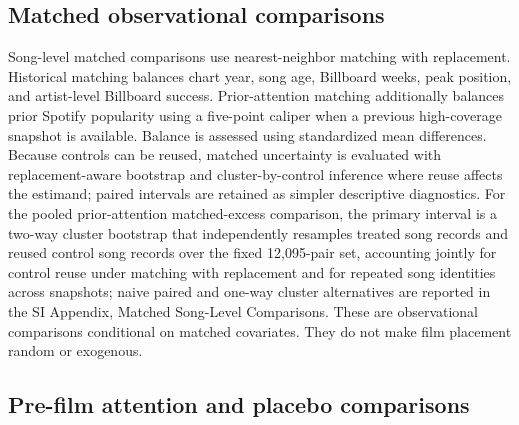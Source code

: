 \documentclass[10pt]{article}
\begin{document}
\subsection*{Matched observational comparisons}

Song-level matched comparisons use nearest-neighbor matching with replacement. Historical matching balances chart year, song age, Billboard weeks, peak position, and artist-level Billboard success. Prior-attention matching additionally balances prior Spotify popularity using a five-point caliper when a previous high-coverage snapshot is available. Balance is assessed using standardized mean differences. Because controls can be reused, matched uncertainty is evaluated with replacement-aware bootstrap and cluster-by-control inference where reuse affects the estimand; paired intervals are retained as simpler descriptive diagnostics. For the pooled prior-attention matched-excess comparison, the primary interval is a two-way cluster bootstrap that independently resamples treated song records and reused control song records over the fixed 12,095-pair set, accounting jointly for control reuse under matching with replacement and for repeated song identities across snapshots; naive paired and one-way cluster alternatives are reported in the SI Appendix, Matched Song-Level Comparisons. These are observational comparisons conditional on matched covariates. They do not make film placement random or exogenous.

\subsection*{Pre-film attention and placebo comparisons}
\end{document}
